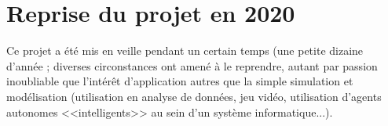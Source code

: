 \documentclass[11pt,twoside,a4paper]{article}
\begin{document}
%

\clearpage

\section{Reprise du projet en 2020}

Ce projet a {\'e}t{\'e} mis en veille pendant un certain temps (une petite dizaine d'ann{\'e}e ; diverses circonstances ont amen{\'e} {\`a} le reprendre, autant par passion inoubliable que l'int{\'e}r{\^e}t d'application autres que la simple simulation et mod{\'e}lisation (utilisation en analyse de donn{\'e}es, jeu vid{\'e}o, utilisation d'agents autonomes <<intelligents>> au sein d'un syst{\`e}me informatique...).~\\
\end{document}
